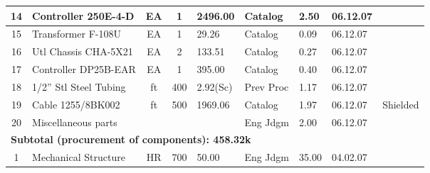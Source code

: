 \begin{table}
\begin{tabular}{|c|p{3.7cm}|c|c|p{1.4cm}|p{1.6cm}|p{1.5cm}|p{1.2cm}|p{2.5cm}|}
{\footnotesize 14} & {\footnotesize Controller 250E-4-D} & {\footnotesize EA} & {\footnotesize 1} & {\footnotesize 2496.00} & {\footnotesize Catalog} & {\footnotesize 2.50} & {\footnotesize 06.12.07} & {\footnotesize }\\ \hline


{\footnotesize 15} & {\footnotesize Transformer F-108U} & {\footnotesize EA} & {\footnotesize 1} & {\footnotesize 29.26} & {\footnotesize Catalog} & {\footnotesize 0.09} & {\footnotesize 06.12.07} & {\footnotesize }\\ \hline

{\footnotesize 16} & {\footnotesize Utl Chassis CHA-5X21} & {\footnotesize EA} & {\footnotesize 2} & {\footnotesize 133.51} & {\footnotesize Catalog} & {\footnotesize 0.27} & {\footnotesize 06.12.07} & {\footnotesize }\\ \hline

{\footnotesize 17} & {\footnotesize Controller DP25B-EAR} & {\footnotesize EA} & {\footnotesize 1} & {\footnotesize 395.00} & {\footnotesize Catalog} & {\footnotesize 0.40} & {\footnotesize 06.12.07} & {\footnotesize }\\ \hline

{\footnotesize 18} & {\footnotesize 1/2'' Stl Steel Tubing} & {\footnotesize ft} & {\footnotesize 400} & {\footnotesize 2.92(Sc)} & {\footnotesize Prev Proc} & {\footnotesize 1.17} & {\footnotesize 06.12.07} & {\footnotesize }\\ \hline

{\footnotesize 19} & {\footnotesize Cable 1255/8BK002} & {\footnotesize ft} & {\footnotesize 500} & {\footnotesize 1969.06} & {\footnotesize Catalog} & {\footnotesize 1.97} & {\footnotesize 06.12.07} & {\footnotesize Shielded}\\ \hline

{\footnotesize 20} & {\footnotesize Miscellaneous parts} & {\footnotesize } & {\footnotesize } & {\footnotesize } & {\footnotesize Eng Jdgm} & {\footnotesize 2.00} & {\footnotesize 06.12.07} & {\footnotesize }\\ \hline


\multicolumn{9}{|l|}{ \bf \hspace{0.5cm} Subtotal (procurement of components): \hspace{1.6cm} 458.32k }  \\ \hline


{\footnotesize 1} & {\footnotesize Mechanical Structure} & {\footnotesize HR} & {\footnotesize 700} & {\footnotesize 50.00} & {\footnotesize Eng Jdgm} & {\footnotesize 35.00} & {\footnotesize 04.02.07} & {\footnotesize }\\ \hline


\end{tabular}
\end{table}
